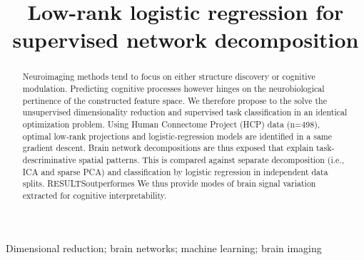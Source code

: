 \documentclass[10pt, conference, compsocconf]{IEEEtran}
\begin{document}
%
\title{Low-rank logistic regression for supervised network decomposition}
%
\author{
}



\maketitle              %

\begin{abstract}
Neuroimaging methods tend to focus on either structure discovery
or cognitive modulation. Predicting cognitive processes however hinges
on the neurobiological pertinence of the constructed feature space.
%
We therefore propose to the solve the unsupervised dimensionality reduction
and supervised task classification in
an identical optimization problem. Using
Human Connectome Project (HCP) data (n=498), optimal low-rank projections and
logistic-regression models are identified in a same gradient descent. Brain
network decompositions are thus exposed that explain task-descriminative spatial
patterns. This is compared against separate decomposition (i.e., ICA and
sparse PCA) and classification by logistic regression in independent data splits.
%
RESULTSoutperformes
%
We thus provide modes of brain signal variation extracted for
cognitive interpretability.
%
\end{abstract}

\begin{IEEEkeywords}
Dimensional reduction; brain networks; machine learning; brain imaging
\end{IEEEkeywords}
\end{document}
